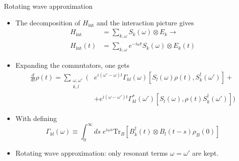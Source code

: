 \documentclass[10pt,xcolor={table,dvipsnames},t]{beamer}
\newcommand{\dt}{\frac{d}{dt}}
\newcommand{\Hint}{H_{\text{int}}}
\begin{document}
\begin{frame}{Rotating wave approximation}
  \begin{itemize}
    \item<1-> The decomposition of $\Hint$ and the interaction picture gives 
    \begin{equation}
      \begin{split}
        \Hint &= \sum_{k, \omega} S_k(\omega)\otimes E_k \rightarrow \\
        \Hint(t) &= \sum_{k,\omega}e^{-i\omega t}S_k(\omega)\otimes E_k(t)
      \end{split}
    \end{equation}
    \item<2-> Expanding the commutators, one gets 
      \begin{equation}
        \begin{split}
          \dt \rho(t) = \sum_{\substack{\omega, \omega'\\ k,l}}\biggl(&
          e^{i(\omega'-\omega)t}\Gamma_{kl}(\omega)[S_l(\omega)\rho(t),S^\dag_k(\omega')]+\\
                                                               &+ e^{i(\omega-\omega')t} \Gamma^*_{kl}(\omega')
                                                             [S_l(\omega),\rho(t)S_k^\dag(\omega')] \biggr)
        \end{split}
      \end{equation}
    \item<2-> With defining 
      \begin{equation}
        \Gamma_{kl}(\omega) \equiv \int_0^\infty ds\; e^{i\omega s} \text{Tr}_B
        [B_k^\dag(t)\otimes B_l(t-s)\rho_B(0)]
      \end{equation}
    \item<3-> Rotating wave approximation: only resonant terms $\omega=\omega'$ are kept. 
  \end{itemize}
\end{frame}
\end{document}
